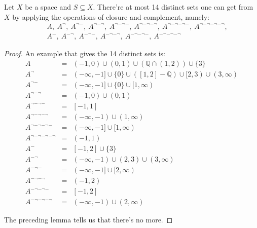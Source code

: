 \documentclass[12pt]{book}
\begin{document}
\begin{corollary}
	Let $X$ be a space and $S\subseteq X$. There're at most 14 distinct sets one can get from $X$ by applying the operations of closure and complement, namely:
	\begin{eqnarray}
		&&A,\ A^{\neg},\ A^{\neg-},\ A^{\neg-\neg},\ A^{\neg-\neg-},\ A^{\neg-\neg-\neg},\ A^{\neg-\neg-\neg-},\ A^{\neg -\neg-\neg-\neg},\nonumber \\
		&&A^-,\ A^{-\neg},\ A^{-\neg-},\ A^{-\neg-\neg},\ A^{-\neg-\neg-},\ A^{-\neg-\neg-\neg}
	\end{eqnarray}
\end{corollary}
\begin{proof}
	An example that gives the 14 distinct sets is:
	\begin{eqnarray}
		A&=&(-1,0)\cup(0,1)\cup(\mathbb Q\cap(1,2))\cup\{3\}\\
		A^{\neg}&=&(-\infty,-1]\cup\{0\}\cup([1,2]-\mathbb Q)\cup [2,3)\cup(3,\infty)\\
		A^{\neg-}&=&(-\infty,-1]\cup\{0\}\cup[1,\infty)\\
		A^{\neg-\neg}&=&(-1,0)\cup(0,1)\\
		A^{\neg-\neg-}&=&[-1,1]\\
		A^{\neg-\neg-\neg}&=&(-\infty,-1)\cup(1,\infty)\\
		A^{\neg-\neg-\neg-}&=&(-\infty,-1]\cup[1,\infty)\\
		A^{\neg -\neg-\neg-\neg}&=&(-1,1)\\
		A^{-}&=&[-1,2]\cup\{3\}\\
		A^{-\neg}&=&(-\infty,-1)\cup (2,3)\cup(3,\infty)\\
		A^{-\neg-}&=&(-\infty,-1]\cup [2,\infty)\\
		A^{-\neg-\neg}&=&(-1,2)\\
		A^{-\neg-\neg-}&=&[-1,2]\\
		A^{-\neg-\neg-\neg}&=&(-\infty,-1)\cup (2,\infty)
	\end{eqnarray}
	
	The preceding lemma tells us that there's no more.
\end{proof}
\end{document}
